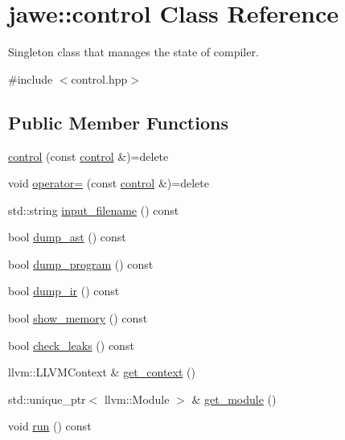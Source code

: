 \hypertarget{classjawe_1_1control}{}\section{jawe\+:\+:control Class Reference}
\label{classjawe_1_1control}


Singleton class that manages the state of compiler.  




{\ttfamily \#include $<$control.\+hpp$>$}

\subsection*{Public Member Functions}
\begin{DoxyCompactItemize}
\item 
\hyperlink{classjawe_1_1control_a389d474b7c44f71337414bc0654be440}{control} (const \hyperlink{classjawe_1_1control}{control} \&)=delete
\item 
void \hyperlink{classjawe_1_1control_ae93188db9e9ff6f31820b65338170743}{operator=} (const \hyperlink{classjawe_1_1control}{control} \&)=delete
\item 
std\+::string \hyperlink{classjawe_1_1control_adba7db777afd24542c7964b37c40ddd9}{input\+\_\+filename} () const
\item 
bool \hyperlink{classjawe_1_1control_af6b03624889bba5b03ec0c2587dfcb0a}{dump\+\_\+ast} () const
\item 
bool \hyperlink{classjawe_1_1control_ad13168abb7f48d6e748a4f13f45db5b4}{dump\+\_\+program} () const
\item 
bool \hyperlink{classjawe_1_1control_a2e83d269a8836025b9f825beef846fe7}{dump\+\_\+ir} () const
\item 
bool \hyperlink{classjawe_1_1control_a504da571a1eeb32bf9c9b5957dca5ae1}{show\+\_\+memory} () const
\item 
bool \hyperlink{classjawe_1_1control_a3770ef7a1572ac8d25f30785d04c4e1a}{check\+\_\+leaks} () const
\item 
llvm\+::\+L\+L\+V\+M\+Context \& \hyperlink{classjawe_1_1control_a77eced5b2483f1d9b3f95d8137f2e8b6}{get\+\_\+context} ()
\item 
std\+::unique\+\_\+ptr$<$ llvm\+::\+Module $>$ \& \hyperlink{classjawe_1_1control_ab332f27bb37743e03c9e61ddc93da26c}{get\+\_\+module} ()
\item 
void \hyperlink{classjawe_1_1control_aedf6bf138a9ef62d589458b65f62eae5}{run} () const
\end{DoxyCompactItemize}
